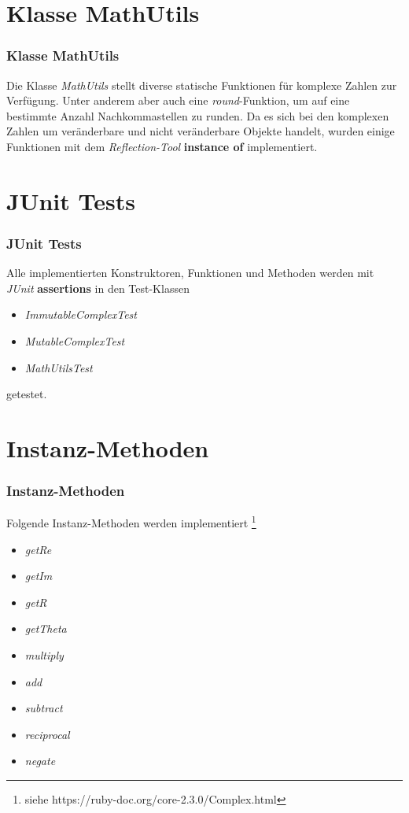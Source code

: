 \documentclass{beamer}
\begin{document}
\section{Klasse MathUtils}
\begin{frame}
\frametitle{Klasse MathUtils}

Die Klasse \textit{MathUtils} stellt diverse statische Funktionen f\"ur komplexe Zahlen zur Verf\"ugung.
Unter anderem aber auch eine \textit{round}-Funktion, um auf eine bestimmte Anzahl Nachkommastellen zu runden.
Da es sich bei den komplexen Zahlen um ver\"anderbare und nicht ver\"anderbare Objekte handelt, wurden
einige Funktionen mit dem \textit{Reflection-Tool} \textbf{instance of} implementiert.

\end{frame}

\section{JUnit Tests}
\begin{frame}
\frametitle{JUnit Tests}

Alle implementierten Konstruktoren, Funktionen und Methoden werden mit \textit{JUnit} \textbf{assertions} in den Test-Klassen
\begin{itemize}
\item \textit{ImmutableComplexTest}
\item \textit{MutableComplexTest}
\item \textit{MathUtilsTest}
\end{itemize}
getestet.

\end{frame}

\section{Instanz-Methoden}
\begin{frame}
\frametitle{Instanz-Methoden}

Folgende Instanz-Methoden werden implementiert \footnote{siehe https://ruby-doc.org/core-2.3.0/Complex.html}
\begin{itemize}
\item \textit{getRe}
\item \textit{getIm}
\item \textit{getR}
\item \textit{getTheta}
\item \textit{multiply}
\item \textit{add}
\item \textit{subtract}
\item \textit{reciprocal}
\item \textit{negate}
\end{itemize}

\end{frame}
\end{document}
